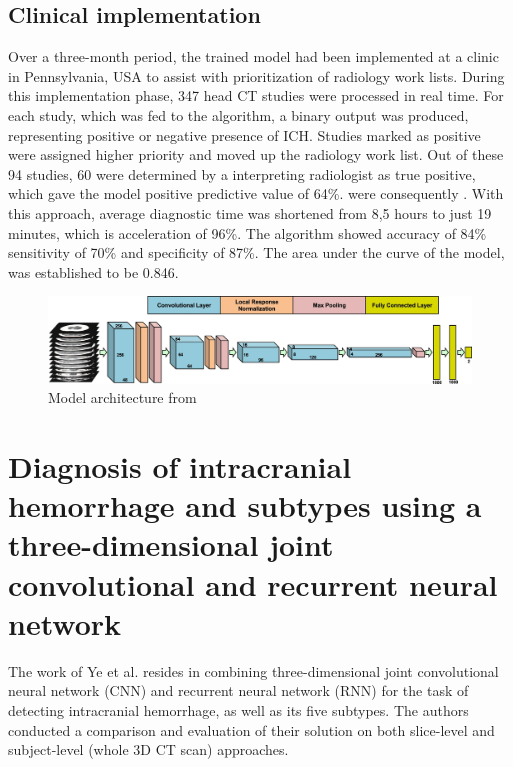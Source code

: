\subsection*{Clinical implementation} 
Over a three-month period, the trained model had been implemented at a clinic in Pennsylvania, USA to assist with prioritization of radiology work lists. During this implementation phase, 347 head CT studies were processed in real time. For each study, which was fed to the algorithm, a binary output was produced, representing positive or negative presence of ICH. Studies marked as positive were assigned higher priority and moved up the radiology work list. Out of these 94 studies, 60 were determined by a interpreting radiologist as true positive, which gave the model positive predictive value of 64\%. were consequently . With this approach, average diagnostic time was shortened from 8,5 hours to just 19 minutes, which is acceleration of 96\%. The algorithm showed accuracy of 84\% sensitivity of 70\%  and specificity of 87\%. The area under the curve of the model, was established to be 0.846.
\begin{figure}[!ht]
\begin{centering}
\includegraphics[width=16cm]{assets/images/RW1-net-arch.png}
\par\end{centering}
\caption{Model architecture from  \label{fig:rw1}}
\end{figure}

\section{Diagnosis of intracranial hemorrhage and subtypes using a three-dimensional joint convolutional and recurrent neural network}

The work of Ye et al. \cite{relatedWork2} resides in combining three-dimensional joint convolutional neural network (CNN) and recurrent neural network (RNN) for the task of detecting intracranial hemorrhage, as well as its five subtypes. The authors conducted a comparison and evaluation of their solution on both slice-level and subject-level (whole 3D CT scan) approaches.

